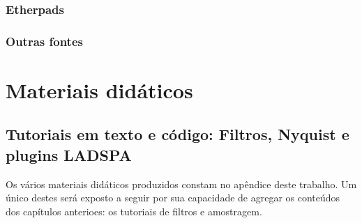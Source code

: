\subsubsection{Etherpads}

\subsubsection{Outras fontes}


\section{Materiais didáticos}

  \subsection{Tutoriais em texto e código: Filtros, Nyquist e plugins LADSPA}

Os vários materiais didáticos produzidos constam no apêndice
deste trabalho. Um único destes será exposto a seguir por sua
capacidade de agregar os conteúdos dos capítulos anterioes:
os tutoriais de filtros e amostragem.

